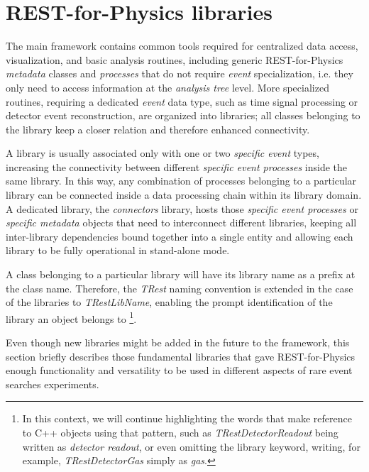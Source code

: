 \section{REST-for-Physics libraries}

\label{sec:libraries}

The main framework contains common tools required for centralized data access, visualization, and basic analysis routines, including generic REST-for-Physics \emph{metadata} classes and \emph{processes} that do not require \emph{event} specialization, i.e. they only need to access information at the \emph{analysis tree} level. More specialized routines, requiring a dedicated \emph{event} data type, such as time signal processing or detector event reconstruction, are organized into libraries; all classes belonging to the library keep a closer relation and therefore enhanced connectivity.

A library is usually associated only with one or two \emph{specific event} types, increasing the connectivity between different \emph{specific event processes} inside the same library. In this way, any combination of processes belonging to a particular library can be connected inside a data processing chain within its library domain. A dedicated library, the \emph{connectors} library, hosts those \emph{specific event processes} or \emph{specific metadata} objects that need to interconnect different libraries, keeping all inter-library dependencies bound together into a single entity and allowing each library to be fully operational in stand-alone mode.

A class belonging to a particular library will have its library name as a prefix at the class name. Therefore, the \emph{TRest} naming convention is extended in the case of the libraries to \emph{TRestLibName}, enabling the prompt identification of the library an object belongs to \footnote{In this context, we will continue highlighting the words that make reference to C++ objects using that pattern, such as \emph{TRestDetectorReadout} being written as \emph{detector readout}, or even omitting the library keyword, writing, for example, \emph{TRestDetectorGas} simply as \emph{gas}.}.

Even though new libraries might be added in the future to the framework, this section briefly describes those fundamental libraries that gave REST-for-Physics enough functionality and versatility to be used in different aspects of rare event searches experiments.

